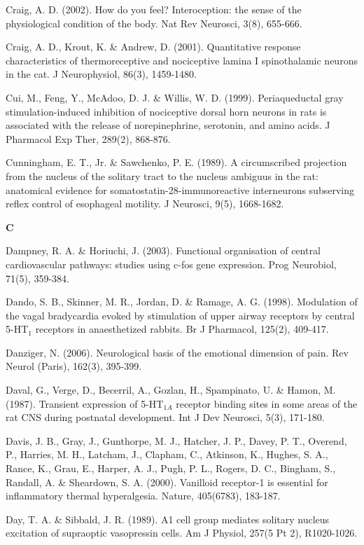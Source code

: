 \documentclass[a4paper,12pt,twoside]{report}
\begin{document}
\begin{singlespacing}
\begin{footnotesize}
Craig, A. D. (2002). How do you feel? Interoception: the sense of the physiological condition of the body. Nat Rev Neurosci, 3(8), 655-666.

Craig, A. D., Krout, K. \& Andrew, D. (2001). Quantitative response characteristics of thermoreceptive and nociceptive lamina I spinothalamic neurons in the cat. J Neurophysiol, 86(3), 1459-1480.

Cui, M., Feng, Y., McAdoo, D. J. \& Willis, W. D. (1999). Periaqueductal gray stimulation-induced inhibition of nociceptive dorsal horn neurons in rats is associated with the release of norepinephrine, serotonin, and amino acids. J Pharmacol Exp Ther, 289(2), 868-876.

Cunningham, E. T., Jr. \& Sawchenko, P. E. (1989). A circumscribed projection from the nucleus of the solitary tract to the nucleus ambiguus in the rat: anatomical evidence for somatostatin-28-immunoreactive interneurons subserving reflex control of esophageal motility. J Neurosci, 9(5), 1668-1682.

\medskip
\begin{Large}\textbf{C}\end{Large}

Dampney, R. A. \& Horiuchi, J. (2003). Functional organisation of central cardiovascular pathways: studies using c-fos gene expression. Prog Neurobiol, 71(5), 359-384.

Dando, S. B., Skinner, M. R., Jordan, D. \& Ramage, A. G. (1998). Modulation of the vagal bradycardia evoked by stimulation of upper airway receptors by central 5-HT$_{1}$ receptors in anaesthetized rabbits. Br J Pharmacol, 125(2), 409-417.

Danziger, N. (2006). Neurological basis of the emotional dimension of pain. Rev Neurol (Paris), 162(3), 395-399.

Daval, G., Verge, D., Becerril, A., Gozlan, H., Spampinato, U. \& Hamon, M. (1987). Transient expression of 5-HT$_{1A}$ receptor binding sites in some areas of the rat CNS during postnatal development. Int J Dev Neurosci, 5(3), 171-180.

Davis, J. B., Gray, J., Gunthorpe, M. J., Hatcher, J. P., Davey, P. T., Overend, P., Harries, M. H., Latcham, J., Clapham, C., Atkinson, K., Hughes, S. A., Rance, K., Grau, E., Harper, A. J., Pugh, P. L., Rogers, D. C., Bingham, S., Randall, A. \& Sheardown, S. A. (2000). Vanilloid receptor-1 is essential for inflammatory thermal hyperalgesia. Nature, 405(6783), 183-187.

Day, T. A. \& Sibbald, J. R. (1989). A1 cell group mediates solitary nucleus excitation of supraoptic vasopressin cells. Am J Physiol, 257(5 Pt 2), R1020-1026.


\end{footnotesize}
\end{singlespacing}
\end{document}
